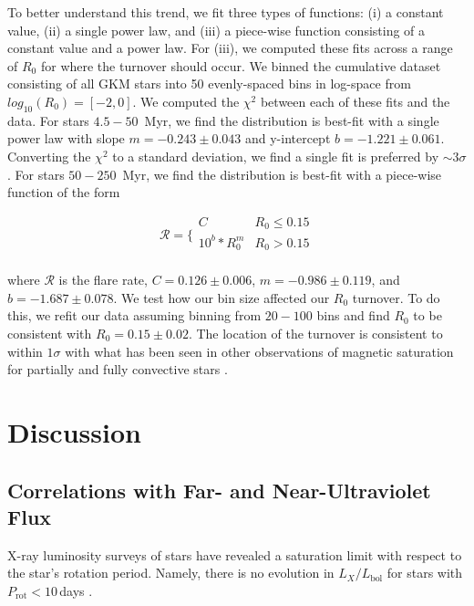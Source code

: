 \documentclass[twocolumn]{aastex631}
\begin{document}
To better understand this trend, we fit three types of functions: (i) a constant value, (ii) a single power law, and
(iii) a piece-wise function consisting of a constant value and a power law. For (iii), we computed these fits across a range
of $R_0$ for where the turnover should occur. We binned the cumulative dataset consisting of all GKM stars into 50 evenly-spaced bins
in log-space from $log_{10}(R_0) = [-2, 0]$. We computed the $\chi^2$ between
each of these fits and the data. For stars $4.5 - 50$~Myr, we find the distribution is best-fit with a single
power law with slope $m = -0.243 \pm 0.043$ and y-intercept $b = -1.221 \pm 0.061$. Converting the $\chi^2$ to a standard
deviation, we find a single fit is preferred by $\sim 3\sigma$. For stars $50 - 250$~Myr, we find the distribution
is best-fit with a piece-wise function of the form

\begin{equation}
  \mathcal{R} =
  \Bigg \{
  \begin{array}{ll}
        C & R_0 \leq 0.15 \\
        10^b * R_0^m  & R_0 > 0.15 \\
  \end{array}
\end{equation}

where $\mathcal{R}$ is the flare rate, $C = 0.126 \pm 0.006$, $m = -0.986 \pm 0.119$, and $b = -1.687 \pm 0.078$.
We test how our bin size affected our $R_0$ turnover. To do this, we refit our data assuming binning from $20 - 100$
bins and find $R_0$ to be consistent with $R_0 = 0.15 \pm 0.02$. The location of the turnover is consistent to
within $1\sigma$ with what has been seen in other observations of magnetic saturation for partially and
fully convective stars \citep[e.g. $L_X/L_\textrm{bol}$; ][]{wright18}.

\section{Discussion}\label{sec:discuss}


\subsection{Correlations with Far- and Near-Ultraviolet Flux}

X-ray luminosity surveys of stars have revealed a saturation limit with respect to
the star's rotation period. Namely, there is no evolution in $L_X/L_\textrm{bol}$ for
stars with $P_\textrm{rot} < 10$\,days \citep{Pizzolato03}.
\end{document}
